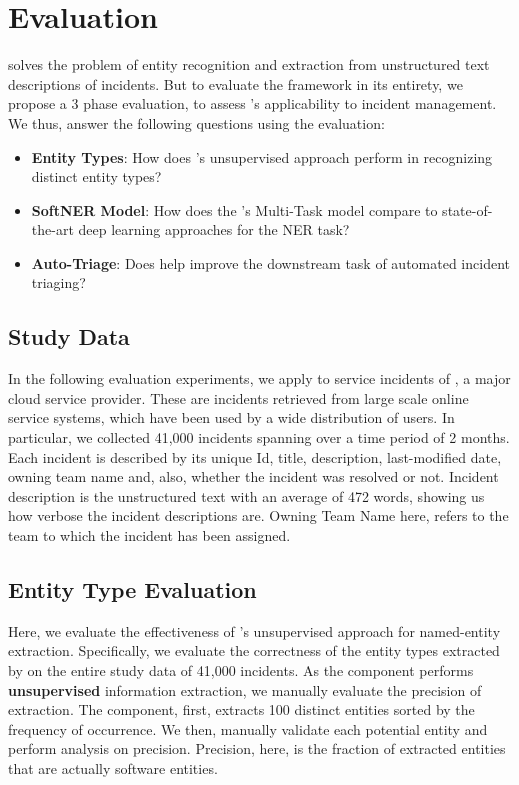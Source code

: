 \section{Evaluation}
\softner{} solves the problem of entity recognition and extraction from unstructured text descriptions of incidents. But to evaluate the \softner{} framework in its entirety, we propose a 3 phase evaluation, to assess \softner{}'s applicability to incident management. We thus, answer the following questions using the evaluation:
\begin{itemize}
    \item \textbf{Entity Types}: How does \softner{}'s unsupervised approach perform in recognizing distinct entity types?
    \item \textbf{SoftNER Model}: How does the \softner{}'s Multi-Task model compare to state-of-the-art deep learning approaches for the NER task?
    \item \textbf{Auto-Triage}: Does \softner{} help improve the downstream task of automated incident triaging?
\end{itemize}

\subsection{Study Data}
\label{sec:study_data}
In the following evaluation experiments, we apply \softner{} to service incidents of \CompanyX{}, a major cloud service provider. These are incidents retrieved from large scale online service systems, which have been used by a wide distribution of users. In particular, we collected 41,000 incidents spanning over a time period of 2 months. Each incident is described by its unique Id, title, description, last-modified date, owning team name and, also, whether the incident was resolved or not. Incident description is the unstructured text with an average of 472 words, showing us how verbose the incident descriptions are. Owning Team Name here, refers to the team to which the incident has been assigned.

\subsection{Entity Type Evaluation} 

Here, we evaluate the effectiveness of \softner{}'s unsupervised approach for named-entity extraction. Specifically, we evaluate the correctness of the entity types extracted by \softner{} on the entire study data of 41,000 incidents. As the component performs \textbf{unsupervised} information extraction, we manually evaluate the precision of extraction. The component, first, extracts 100 distinct entities  sorted by the frequency of occurrence. We then, manually validate each potential entity and perform analysis on precision. Precision, here, is the fraction of extracted entities that are actually software entities.


